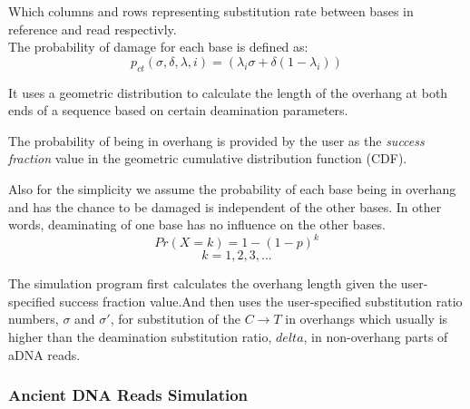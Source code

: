\documentclass[11pt,a4paper]{report}
\begin{document}
Which columns and rows representing substitution rate between bases in reference 
and read respectivly.\\
The probability of damage for each base is defined as\cite{mapdamage2}:\\
$$ p_{ct}(\sigma, \delta, \lambda, i) = ( \lambda_{i} \sigma + \delta(1 - \lambda_{i})) $$
 
It uses a geometric distribution to calculate the length of the overhang at both 
ends of a sequence based on certain deamination parameters.

The probability of being in overhang is provided by the user as the \emph{success 
fraction} value in the geometric cumulative distribution function (CDF).

Also for the simplicity we assume the probability of each base being in overhang 
and has the chance to be damaged is independent of the other bases. In other 
words, deaminating of one base has no influence on the other bases.\\

$$Pr( X=k ) = 1 - (1 - p)^{k}$$
$$ k = 1, 2, 3, ... $$


The simulation program first calculates the overhang length given the user-specified 
success fraction value.And then uses the user-specified substitution ratio numbers,
 $ \sigma $ and $\sigma\prime $, for substitution of the $ C \rightarrow T $ in 
overhangs which usually is higher than the deamination substitution ratio, $delta$, 
in non-overhang parts of aDNA reads.




\subsubsection{Ancient DNA Reads Simulation }  
\label{ Ancient DNA Reads Simulation}
\end{document}
